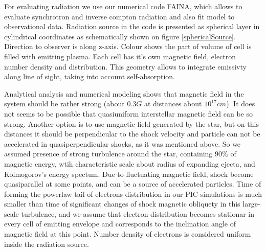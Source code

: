 \documentclass[a4paper,12pt]{extreport}
\begin{document}
For evaluating radiation we use our numerical code FAINA, which allows to evaluate synchrotron and inverse compton radiation and also fit model to observational data. Radiation source in the code is presented as spherical layer in cylindrical coordinates as schematically shown on figure \ref{sphericalSource}. Direction to observer is along z-axis. Colour shows the part of volume of cell is filled with emitting plasma. Each cell has it's own magnetic field, electron number density and distribution. This geometry allows to integrate emissivty along line of sight, taking into account self-absorption.

Analytical analysis \cite{Coppejans2020} and numerical modeling \cite{BykovUniverse} shows that magnetic field in the system should be rather strong (about $0.3 G$ at distances about $10^{17} cm$). It does not seems to be possible that quasiuniform interstellar magnetic field can be so strong. Another option is to use magnetic field generated by the star, but on this distances it should be perpendicular to the shock velocity \cite{Parker} and particle can not be accelerated in quasiperpendicular shocks, as it was mentioned above. So we assumed presence of strong turbulence around the star, containing $90 \%$ of magnetic energy, wtih characteristic scale about radius of expanding ejecta, and Kolmogorov's energy spectum. Due to fluctuating magnetic field, shock become quasiparallel at some points, and can be a source of accelerated particles. Time of forming the powerlaw tail of electrons distribution in our PIC simulations is much smaller than time of significant changes of shock magnetic obliquety in this large-scale turbulence, and we assume that electron distribution becomes stationar in every cell of emitting envelope and corresponds to the inclination angle of magnetic field at this point. Number density of electrons is considered uniform inside the radiation source.
\end{document}
